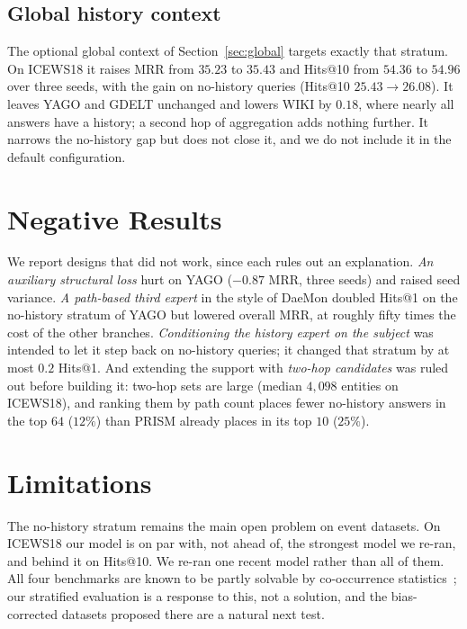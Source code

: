 \documentclass[conference]{IEEEtran}
\begin{document}
\subsection{Global history context}
\label{sec:global-res}

The optional global context of Section~\ref{sec:global} targets exactly that
stratum. On ICEWS18 it raises MRR from $35.23$ to $35.43$ and Hits@10 from
$54.36$ to $54.96$ over three seeds, with the gain on no-history queries
(Hits@10 $25.43 \to 26.08$). It leaves YAGO and GDELT unchanged and lowers WIKI
by $0.18$, where nearly all answers have a history; a second hop of
aggregation adds nothing further. It narrows the no-history gap but does not
close it, and we do not include it in the default configuration.

\section{Negative Results}
\label{sec:negative}

We report designs that did not work, since each rules out an explanation.
\emph{An auxiliary structural loss} hurt on YAGO ($-0.87$ MRR, three seeds) and
raised seed variance. \emph{A path-based third expert} in the style of DaeMon
doubled Hits@1 on the no-history stratum of YAGO but lowered overall MRR, at
roughly fifty times the cost of the other branches. \emph{Conditioning the
history expert on the subject} was intended to let it step back on
no-history queries; it changed that stratum by at most $0.2$ Hits@1. And
extending the support with \emph{two-hop candidates} was ruled out before
building it: two-hop sets are large (median $4{,}098$ entities on ICEWS18), and
ranking them by path count places fewer no-history answers in the top $64$
($12\%$) than PRISM already places in its top $10$ ($25\%$).

\section{Limitations}

The no-history stratum remains the main open problem on event datasets. On
ICEWS18 our model is on par with, not ahead of, the strongest model we re-ran,
and behind it on Hits@10. We re-ran one recent model rather than all of them.
All four benchmarks are known to be partly solvable by co-occurrence
statistics~\cite{shortcut}; our stratified evaluation is a response to this,
not a solution, and the bias-corrected datasets proposed there are a natural
next test.
\end{document}
